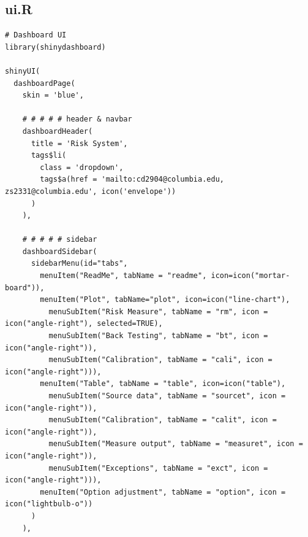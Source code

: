 \documentclass[letterpaper,11pt, oneside]{layout}
\begin{document}
\newpage
\begin{spacing}{1}
\section{ui.R}
\label{sec:code:nn}
\begin{lstlisting}
# Dashboard UI
library(shinydashboard)

shinyUI(
  dashboardPage(
    skin = 'blue',

    # # # # # header & navbar
    dashboardHeader(
      title = 'Risk System',
      tags$li(
        class = 'dropdown',
        tags$a(href = 'mailto:cd2904@columbia.edu, zs2331@columbia.edu', icon('envelope'))
      )
    ),

    # # # # # sidebar
    dashboardSidebar(
      sidebarMenu(id="tabs",
        menuItem("ReadMe", tabName = "readme", icon=icon("mortar-board")),
        menuItem("Plot", tabName="plot", icon=icon("line-chart"),
          menuSubItem("Risk Measure", tabName = "rm", icon = icon("angle-right"), selected=TRUE),
          menuSubItem("Back Testing", tabName = "bt", icon = icon("angle-right")),
          menuSubItem("Calibration", tabName = "cali", icon = icon("angle-right"))),
        menuItem("Table", tabName = "table", icon=icon("table"),
          menuSubItem("Source data", tabName = "sourcet", icon = icon("angle-right")),
          menuSubItem("Calibration", tabName = "calit", icon = icon("angle-right")),
          menuSubItem("Measure output", tabName = "measuret", icon = icon("angle-right")),
          menuSubItem("Exceptions", tabName = "exct", icon = icon("angle-right"))),
        menuItem("Option adjustment", tabName = "option", icon = icon("lightbulb-o"))
      )
    ),


\end{lstlisting}
\end{spacing}
\end{document}
